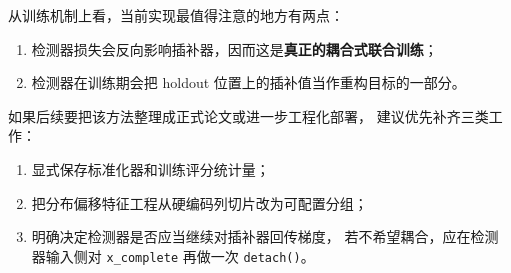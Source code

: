 \documentclass[UTF8,11pt,a4paper]{ctexart}
\begin{document}
从训练机制上看，当前实现最值得注意的地方有两点：
\begin{enumerate}
  \item 检测器损失会反向影响插补器，因而这是\textbf{真正的耦合式联合训练}；
  \item 检测器在训练期会把 holdout 位置上的插补值当作重构目标的一部分。
\end{enumerate}

如果后续要把该方法整理成正式论文或进一步工程化部署，
建议优先补齐三类工作：
\begin{enumerate}
  \item 显式保存标准化器和训练评分统计量；
  \item 把分布偏移特征工程从硬编码列切片改为可配置分组；
  \item 明确决定检测器是否应当继续对插补器回传梯度，
  若不希望耦合，应在检测器输入侧对 \texttt{x\_complete} 再做一次 \texttt{detach()}。
\end{enumerate}
\end{document}
